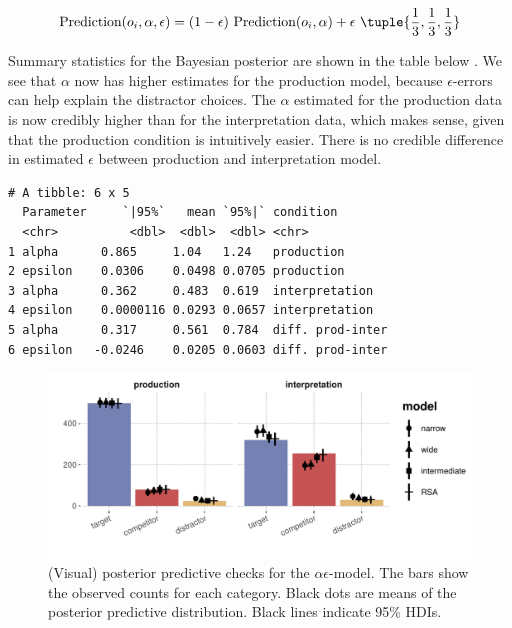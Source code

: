 \documentclass{article}
\begin{document}
\begin{align*}
  \text{Prediction}(o_i, \alpha, \epsilon) = (1-\epsilon) \ \text{Prediction}(o_i, \alpha) + \epsilon \ \tuple{\frac{1}{3}, \frac{1}{3}, \frac{1}{3}}
\end{align*}

Summary statistics for the Bayesian posterior are shown in the table below .
We see that \(\alpha\) now has higher estimates for the production model, because \(\epsilon\)-errors can help explain the distractor choices.
The \(\alpha\) estimated for the production data is now credibly higher than for the interpretation data, which makes sense, given that the production condition is intuitively easier.
There is no credible difference in estimated \(\epsilon\) between production and interpretation model.

\begin{verbatim}
# A tibble: 6 x 5
  Parameter     `|95%`   mean `95%|` condition
  <chr>          <dbl>  <dbl>  <dbl> <chr>
1 alpha      0.865     1.04   1.24   production
2 epsilon    0.0306    0.0498 0.0705 production
3 alpha      0.362     0.483  0.619  interpretation
4 epsilon    0.0000116 0.0293 0.0657 interpretation
5 alpha      0.317     0.561  0.784  diff. prod-inter
6 epsilon   -0.0246    0.0205 0.0603 diff. prod-inter
\end{verbatim}

\begin{figure}[t]
  \centering

  \includegraphics[width = 0.9 \textwidth]{00-pics/PPC-alpha-eps-model.pdf}

    \caption{(Visual) posterior predictive checks for the $\alpha\epsilon$-model.
    The bars show the observed counts for each category.
    Black dots are means of the posterior predictive distribution.
    Black lines indicate 95\% HDIs.
  }

  \label{fig:PPC-alpha-eps-model}
\end{figure}
\end{document}
